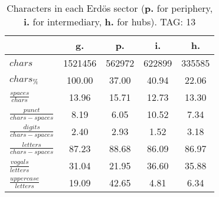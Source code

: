 \begin{table}[h!]
\begin{center}
\begin{tabular}{| l | c | c | c | c |}\hline
 & g. & p. & i. & h. \\\hline
$chars$ & 1521456  & 562972  & 622899  & 335585 \\\hline
$chars_{\%}$ & 100.00  & 37.00  & 40.94  & 22.06 \\\hline
$\frac{spaces}{chars}$ & 13.96  & 15.71  & 12.73  & 13.30 \\\hline
$\frac{punct}{chars-spaces}$ & 8.19  & 6.05  & 10.52  & 7.34 \\\hline
$\frac{digits}{chars-spaces}$ & 2.40  & 2.93  & 1.52  & 3.18 \\\hline
$\frac{letters}{chars-spaces}$ & 87.23  & 88.68  & 86.09  & 86.97 \\\hline
$\frac{vogals}{letters}$ & 31.04  & 21.95  & 36.60  & 35.88 \\\hline
$\frac{uppercase}{letters}$ & 19.09  & 42.65  & 4.81  & 6.34 \\\hline
\end{tabular}
\caption{Characters in each Erd\"os sector ({{\bf p.}} for periphery, {{\bf i.}} for intermediary, 
    {{\bf h.}} for hubs). TAG: 13}
\end{center}
\end{table}